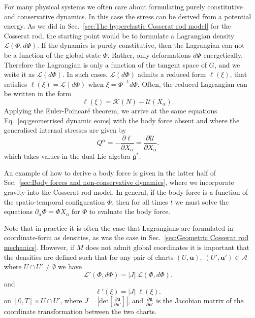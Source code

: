 For many physical systems we often care about formulating purely constitutive and conservative dynamics. In this case the stress can be derived from a potential energy. As we did in Sec.~\ref{sec:The hyperelastic Cosserat rod model} for the Cosserat rod, the starting point would be to formulate a Lagrangian density $\mathcal{L}(\Phi, d \Phi)$. If the dynamics is purely constitutive, then the Lagrangian can not be a function of the global state $\Phi$. Rather, only deformations $d \Phi$ energetically. Therefore the Lagrangian is only a function of the tangent space of $G$, and we write it as $\mathcal{L}(d \Phi)$. In such cases, $\mathcal{L}(d \Phi)$ admits a reduced form $\ell(\xi)$, that satisfies $\ell(\xi) = \mathcal{L}(d \Phi)$ when $\xi = \Phi^{-1} d \Phi$. Often, the reduced Lagrangian can be written in the form
\begin{equation}
\ell(\xi) = \mathcal{K}(N) - \mathcal{U}(X_\alpha).
\end{equation}
Applying the Euler-Poincaré theorem, we arrive at the same equations Eq.~\ref{eq:geometrised dynamic eoms} with the body force absent and where the generalised internal stresses are given by
\begin{equation}
Q^\alpha = - \frac{\partial \ell }{\partial X_\alpha} = \frac{\partial \mathcal{U}}{\partial X_\alpha}.
\end{equation}
which takes values in the dual Lie algebra $\mathfrak{g}^*$.

An example of how to derive a body force is given in the latter half of Sec.~\ref{sec:Body forces and non-conservative dynamics}, where we incorporate gravity into the Cosserat rod model. In general, if the body force is a function of the spatio-temporal configuration $\Phi$, then for all times $t$ we must solve the equations $\partial_\alpha \Phi = \Phi X_\alpha$ for $\Phi$ to evaluate the body force.

Note that in practice it is often the case that Lagrangians are formulated in coordinate-form as densities, as was the case in Sec.~\ref{sec:Geometric Cosserat rod mechanics}. However, if $M$ does not admit global coordinates it is important that the densities are defined such that for any pair of charts $(U, \mathbf{u}),\ (U', \mathbf{u}') \in \mathcal{A}$ where $U \cap U' \neq \emptyset$ we have
\begin{equation} 
\mathcal{L}'(\Phi, d \Phi) = |J|\ \mathcal{L}(\Phi, d \Phi).
\end{equation}
and
\begin{equation} 
\ell'(\xi) = |J|\ \ell(\xi).
\end{equation}
on $[0,T] \times U \cap U'$, where $J = \left| \text{det} \left[ \frac{\partial \mathbf{u} }{ \partial \mathbf{u}' } \right] \right|$, and $\frac{\partial \mathbf{u}}{ \partial \mathbf{u}' }$ is the Jacobian matrix of the coordinate transformation between the two charts.

